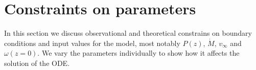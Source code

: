 \section{Constraints on parameters}
\label{sect:parameters}
In this section we discuss observational and theoretical constrains on boundary conditions and input values for the model, most notably $P(z)$, $\dot M$, $v_\infty$ and $\omega(z=0)$. We vary the parameters individually to show how it affects the solution of the ODE.